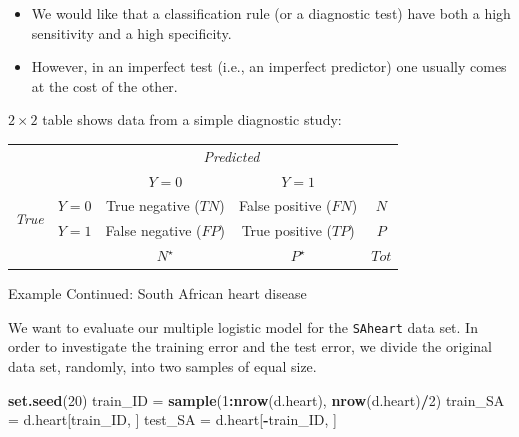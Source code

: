 \documentclass[10pt,ignorenonframetext,]{beamer}
\newenvironment{Shaded}{\begin{snugshade}}{\end{snugshade}}
\newcommand{\KeywordTok}[1]{\textcolor[rgb]{0.13,0.29,0.53}{\textbf{#1}}}
\newcommand{\DecValTok}[1]{\textcolor[rgb]{0.00,0.00,0.81}{#1}}
\newcommand{\StringTok}[1]{\textcolor[rgb]{0.31,0.60,0.02}{#1}}
\newcommand{\OperatorTok}[1]{\textcolor[rgb]{0.81,0.36,0.00}{\textbf{#1}}}
\newcommand{\NormalTok}[1]{#1}
\providecommand{\tightlist}{%
  \setlength{\itemsep}{0pt}\setlength{\parskip}{0pt}}
\begin{document}
\begin{frame}

\begin{itemize}
\tightlist
\item
  We would like that a classification rule (or a diagnostic test) have
  both a high sensitivity and a high specificity.
\item
  However, in an imperfect test (i.e., an imperfect predictor) one
  usually comes at the cost of the other.
\end{itemize}

\(2 \times 2\) table shows data from a simple diagnostic study:

\begin{center}
\begin{tabular}{ll|c|c|c}
& & \multicolumn{2}{c}{\emph{Predicted}} \\
& & $Y=0$ & $Y=1$ \\ 
\hline
\multirow{2}{*}{\emph{True}} & $Y=0$ & True negative ($TN$) & False positive ($FN$) & $N$\\
 & $Y=1$ & False negative ($FP$) & True positive ($TP$) & $P$\\
\hline
& & $N^\star$ & $P^\star$ & $Tot$ 
\end{tabular}
\end{center}

\end{frame}

\begin{frame}[fragile]

\begin{block}{Example Continued: South African heart disease}

We want to evaluate our multiple logistic model for the \texttt{SAheart}
data set. In order to investigate the training error and the test error,
we divide the original data set, randomly, into two samples of equal
size.

\small

\begin{Shaded}
\begin{Highlighting}[]
\KeywordTok{set.seed}\NormalTok{(}\DecValTok{20}\NormalTok{)}
\NormalTok{train_ID =}\StringTok{ }\KeywordTok{sample}\NormalTok{(}\DecValTok{1}\OperatorTok{:}\KeywordTok{nrow}\NormalTok{(d.heart), }\KeywordTok{nrow}\NormalTok{(d.heart)}\OperatorTok{/}\DecValTok{2}\NormalTok{)}
\NormalTok{train_SA =}\StringTok{ }\NormalTok{d.heart[train_ID, ]}
\NormalTok{test_SA =}\StringTok{ }\NormalTok{d.heart[}\OperatorTok{-}\NormalTok{train_ID, ]}
\end{Highlighting}
\end{Shaded}

\end{block}

\end{frame}
\end{document}
